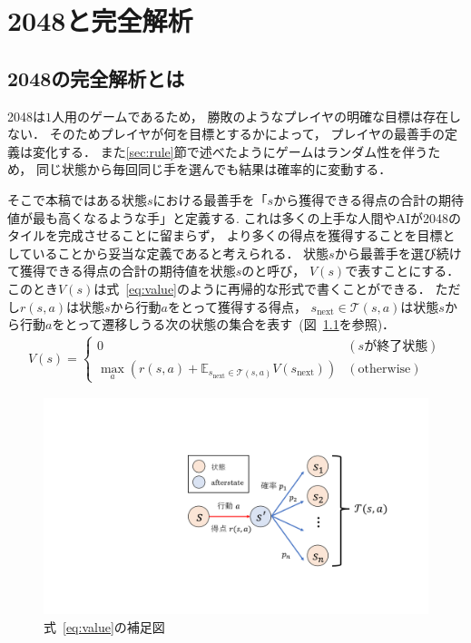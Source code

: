 \chapter{2048と完全解析}

\section{2048の完全解析とは}
\label{sec:solving}
2048は$1$人用のゲームであるため， 勝敗のようなプレイヤの明確な目標は存在しない．
そのためプレイヤが何を目標とするかによって， プレイヤの最善手の定義は変化する．
また\ref{sec:rule}節で述べたようにゲームはランダム性を伴うため， 同じ状態から毎回同じ手を選んでも結果は確率的に変動する．

そこで本稿ではある状態$s$における最善手を「$s$から獲得できる得点の合計の期待値が最も高くなるような手」と定義する.
これは多くの上手な人間やAIが2048のタイルを完成させることに留まらず， より多くの得点を獲得することを目標としていることから妥当な定義であると考えられる．
状態$s$から最善手を選び続けて獲得できる得点の合計の期待値を状態$s$のと呼び， $V(s)$で表すことにする．
このとき$V(s)$は式~\ref{eq:value}のように再帰的な形式で書くことができる．
ただし$r(s,a)$は状態$s$から行動$a$をとって獲得する得点， $s_\text{next} \in \mathcal{T}(s,a)$は状態$s$から行動$a$をとって遷移しうる次の状態の集合を表す~(図~\ref{fig:state_afterstate}を参照)．
\begin{align}
    V(s) =
    \begin{cases}
        0 & (s \text{が終了状態}) \\
        \max_a \left(r(s,a) + \mathbb{E}_{s_\text{next} \in \mathcal{T}(s,a)} V(s_\text{next}) \right) & (\text{otherwise})
    \end{cases}
    \label{eq:value}
\end{align}

\begin{figure}[t]
    \centering
    \includegraphics[width=\linewidth{}]{figures/value_function_.pdf}
    \caption{式~\ref{eq:value}の補足図 \label{fig:state_afterstate}}
\end{figure}

